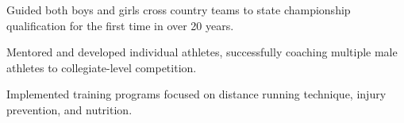 \item Guided both boys and girls cross country teams to state championship qualification for the first time in over 20 years.
\item Mentored and developed individual athletes, successfully coaching multiple male athletes to collegiate-level competition.
\item Implemented training programs focused on distance running technique, injury prevention, and nutrition.
